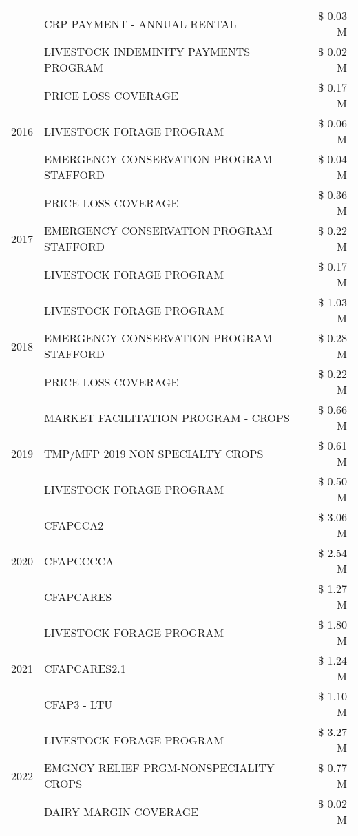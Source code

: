 \begin{tabular}{llr}
 & CRP PAYMENT - ANNUAL RENTAL & \$ 0.03 M \\
 & LIVESTOCK INDEMINITY PAYMENTS PROGRAM & \$ 0.02 M \\
\cline{1-3}
\multirow[t]{3}{*}{2016} & PRICE LOSS COVERAGE & \$ 0.17 M \\
 & LIVESTOCK FORAGE PROGRAM & \$ 0.06 M \\
 & EMERGENCY CONSERVATION PROGRAM STAFFORD & \$ 0.04 M \\
\cline{1-3}
\multirow[t]{3}{*}{2017} & PRICE LOSS COVERAGE & \$ 0.36 M \\
 & EMERGENCY CONSERVATION PROGRAM STAFFORD & \$ 0.22 M \\
 & LIVESTOCK FORAGE PROGRAM & \$ 0.17 M \\
\cline{1-3}
\multirow[t]{3}{*}{2018} & LIVESTOCK FORAGE PROGRAM & \$ 1.03 M \\
 & EMERGENCY CONSERVATION PROGRAM STAFFORD & \$ 0.28 M \\
 & PRICE LOSS COVERAGE & \$ 0.22 M \\
\cline{1-3}
\multirow[t]{3}{*}{2019} & MARKET FACILITATION PROGRAM - CROPS & \$ 0.66 M \\
 & TMP/MFP 2019 NON SPECIALTY CROPS & \$ 0.61 M \\
 & LIVESTOCK FORAGE PROGRAM & \$ 0.50 M \\
\cline{1-3}
\multirow[t]{3}{*}{2020} & CFAPCCA2 & \$ 3.06 M \\
 & CFAPCCCCA & \$ 2.54 M \\
 & CFAPCARES & \$ 1.27 M \\
\cline{1-3}
\multirow[t]{3}{*}{2021} & LIVESTOCK FORAGE PROGRAM & \$ 1.80 M \\
 & CFAPCARES2.1 & \$ 1.24 M \\
 & CFAP3 - LTU & \$ 1.10 M \\
\cline{1-3}
\multirow[t]{3}{*}{2022} & LIVESTOCK FORAGE PROGRAM & \$ 3.27 M \\
 & EMGNCY RELIEF PRGM-NONSPECIALITY CROPS & \$ 0.77 M \\
 & DAIRY MARGIN COVERAGE & \$ 0.02 M \\
\cline{1-3}
\bottomrule
\end{tabular}
